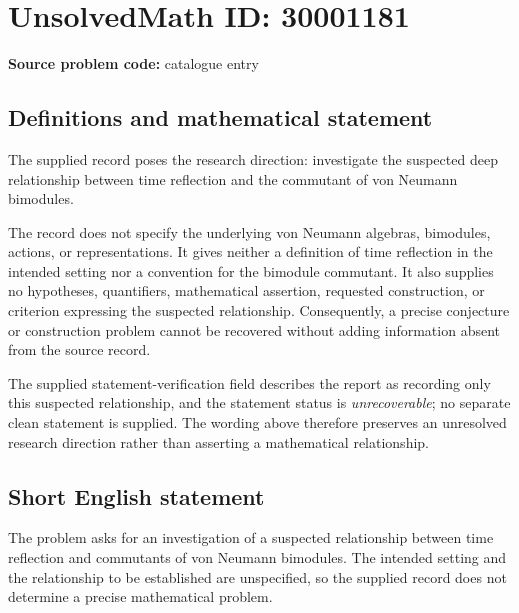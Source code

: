 \documentclass[11pt]{article}
\begin{document}
\section*{UnsolvedMath ID: 30001181}
\textbf{Source problem code:} catalogue entry
\subsection{Definitions and mathematical statement}
The supplied record poses the research direction: investigate the suspected deep relationship between time reflection and the commutant of von Neumann bimodules.

The record does not specify the underlying von Neumann algebras, bimodules, actions, or representations. It gives neither a definition of time reflection in the intended setting nor a convention for the bimodule commutant. It also supplies no hypotheses, quantifiers, mathematical assertion, requested construction, or criterion expressing the suspected relationship. Consequently, a precise conjecture or construction problem cannot be recovered without adding information absent from the source record.

The supplied statement-verification field describes the report as recording only this suspected relationship, and the statement status is \emph{unrecoverable}; no separate clean statement is supplied. The wording above therefore preserves an unresolved research direction rather than asserting a mathematical relationship.
\subsection{Short English statement}
The problem asks for an investigation of a suspected relationship between time reflection and commutants of von Neumann bimodules. The intended setting and the relationship to be established are unspecified, so the supplied record does not determine a precise mathematical problem.
\end{document}
